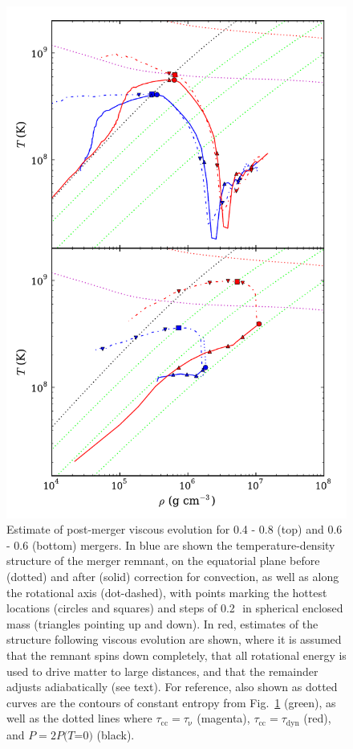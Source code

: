 \begin{figure}
\label{fig:c2_willitexplode}
\end{figure}



\begin{figure}
\centering
\includegraphics[angle=0,width=0.6\columnwidth]{chapter2_zhu+13/figures/PMEvolution.pdf}
\caption{Estimate of post-merger viscous evolution for 0.4 - 0.8 {\Msun} (top) and 0.6 - 0.6 {\Msun} (bottom) mergers.  In blue are shown the temperature-density structure of the merger remnant, on the equatorial plane before (dotted) and after (solid) correction for convection, as well as along the rotational axis (dot-dashed), with points marking the hottest locations (circles and squares) and steps of 0.2\,\Msun\ in spherical enclosed mass (triangles pointing up and down).  In red, estimates of the structure following viscous evolution are shown, where it is assumed that the remnant spins down completely, that all rotational energy is used to drive matter to large distances, and that the remainder adjusts adiabatically (see text).  For reference, also shown as dotted curves are the contours of constant entropy from Fig.~\ref{fig:c2_willitexplode} (green), as well as the dotted lines where $\tau_\mathrm{cc} = \tau_\mathrm{\nu}$ (magenta), $\tau_\mathrm{cc} = \tau_\mathrm{dyn}$ (red), and $P = 2P(T$=$0)$ (black).}
\label{fig:c2_pmevolution}
\end{figure}

